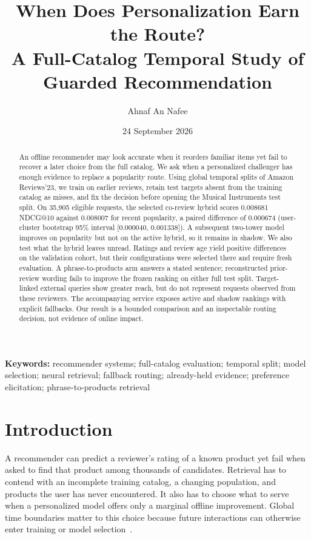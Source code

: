\documentclass[11pt]{article}
\title{When Does Personalization Earn the Route?\\A Full-Catalog Temporal Study of Guarded Recommendation}
\author{Ahnaf An Nafee}
\date{24 September 2026}
\begin{document}
\maketitle

\begin{abstract}
An offline recommender may look accurate when it reorders familiar items yet fail to recover a later choice from the full catalog. We ask when a personalized challenger has enough evidence to replace a popularity route. Using global temporal splits of Amazon Reviews'23, we train on earlier reviews, retain test targets absent from the training catalog as misses, and fix the decision before opening the Musical Instruments test split. On 35,905 eligible requests, the selected co-review hybrid scores 0.008681 NDCG@10 against 0.008007 for recent popularity, a paired difference of 0.000674 (user-cluster bootstrap 95\% interval [0.000040, 0.001338]). A subsequent two-tower model improves on popularity but not on the active hybrid, so it remains in shadow. We also test what the hybrid leaves unread. Ratings and review age yield positive differences on the validation cohort, but their configurations were selected there and require fresh evaluation. A phrase-to-products arm answers a stated sentence; reconstructed prior-review wording fails to improve the frozen ranking on either full test split. Target-linked external queries show greater reach, but do not represent requests observed from these reviewers. The accompanying service exposes active and shadow rankings with explicit fallbacks. Our result is a bounded comparison and an inspectable routing decision, not evidence of online impact.
\end{abstract}

\noindent\textbf{Keywords:} recommender systems; full-catalog evaluation; temporal split; model selection; neural retrieval; fallback routing; already-held evidence; preference elicitation; phrase-to-products retrieval

\section{Introduction}
A recommender can predict a reviewer's rating of a known product yet fail when asked to find that product among thousands of candidates. Retrieval has to contend with an incomplete training catalog, a changing population, and products the user has never encountered. It also has to choose what to serve when a personalized model offers only a marginal offline improvement. Global time boundaries matter to this choice because future interactions can otherwise enter training or model selection~\cite{ji2023leakage,gusak2025time}.
\end{document}
